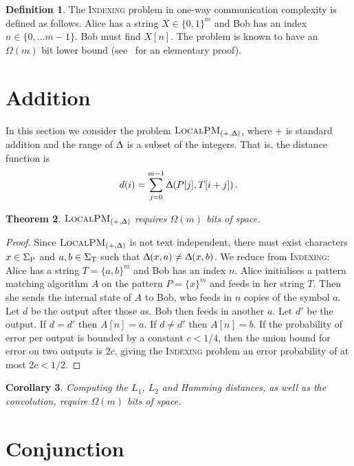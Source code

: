 \documentclass{article}
\renewcommand{\Delta}{\Updelta}
\newcommand{\indexing}{\textsc{Indexing}\xspace}
\newcommand{\SigmaP}{\ensuremath{\Sigma_{\textup{P}}}}
\newcommand{\SigmaT}{\ensuremath{\Sigma_{\textup{T}}}}
\newcommand{\local}{\ensuremath{\textsc{LocalPM}}}
\theoremstyle{plain}
\newtheorem{theorem}{Theorem}[]
\newtheorem{corollary}[theorem]{Corollary}
\theoremstyle{definition}
\newtheorem{definition}[theorem]{Definition}
\begin{document}
\begin{definition}
    \label{def:indexing}
    The \indexing problem in one-way communication complexity is defined as follows. Alice has a string $X\in\{0,1\}^{m}$ and Bob has an index $n\in\{0,\ldots m-1\}$. Bob must find $X[n]$. The problem is known to have an $\Omega(m)$ bit lower bound (see~\cite{JKS:08} for an elementary proof).
\end{definition}


\section{Addition}\label{sec:addition}

In this section we consider the problem $\local_{(+,\Delta)}$, where $+$ is standard addition and the range of $\Delta$ is a subset of the integers. That is, the distance function is
\begin{equation*}
    d(i)=\sum_{j=0}^{m-1}\Delta(P[j],T[i+j])\,.
\end{equation*}

\begin{theorem}
    $\local_{(+,\Delta)}$ requires $\Omega(m)$ bits of space.
\end{theorem}
\begin{proof}
    Since $\local_{(+,\Delta)}$ is not text independent, there must exist characters $x\in\SigmaP$ and $a,b\in\SigmaT$ such that $\Delta(x,a)\neq\Delta(x,b)$. We reduce from \indexing: Alice has a string $T=\{a,b\}^m$ and Bob has an index $n$. Alice initialises a pattern matching algorithm $A$ on the pattern $P=\{x\}^m$ and feeds in her string $T$. Then she sends the internal state of $A$ to Bob, who feeds in $n$ copies of the symbol $a$. Let $d$ be the output after those $a$s. Bob then feeds in another $a$. Let $d'$ be the output. If $d=d'$ then $A[n]=a$. If $d\neq d'$ then $A[n]=b$. If the probability of error per output is bounded by a constant $c<1/4$, then the union bound for error on two outputs is $2c$, giving the \indexing problem an error probability of at most $2c<1/2$.
\end{proof}

\begin{corollary}
    \label{cor:standard-addition}
    Computing the $L_{1}$, $L_{2}$ and Hamming distances, as well as the convolution, require $\Omega(m)$ bits of space.
\end{corollary}


\section{Conjunction} \label{sec:wildcard}
\end{document}
